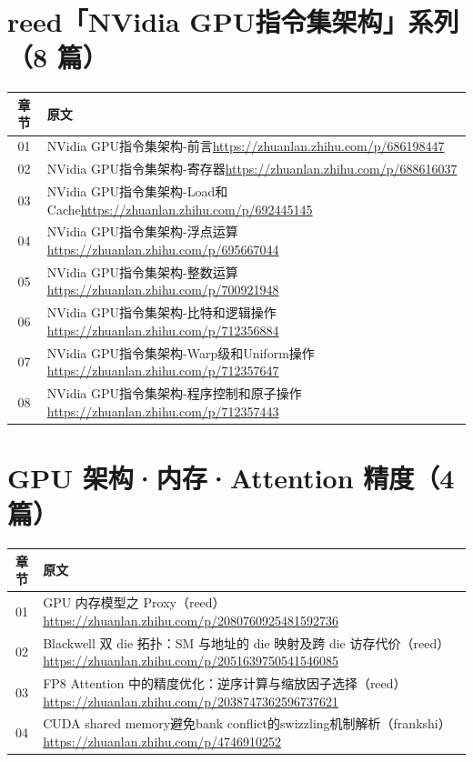 \documentclass[9pt,openany]{ctexbook}
\begin{document}
\section*{reed「NVidia GPU指令集架构」系列（8 篇）}
\begingroup\small
\begin{tabular}{@{}c>{\raggedright\arraybackslash}p{}@{}}
  \toprule
  章节 & 原文 \\
  \midrule
  01 & NVidia GPU指令集架构-前言\newline\url{https://zhuanlan.zhihu.com/p/686198447} \\
  02 & NVidia GPU指令集架构-寄存器\newline\url{https://zhuanlan.zhihu.com/p/688616037} \\
  03 & NVidia GPU指令集架构-Load和Cache\newline\url{https://zhuanlan.zhihu.com/p/692445145} \\
  04 & NVidia GPU指令集架构-浮点运算\newline\url{https://zhuanlan.zhihu.com/p/695667044} \\
  05 & NVidia GPU指令集架构-整数运算\newline\url{https://zhuanlan.zhihu.com/p/700921948} \\
  06 & NVidia GPU指令集架构-比特和逻辑操作\newline\url{https://zhuanlan.zhihu.com/p/712356884} \\
  07 & NVidia GPU指令集架构-Warp级和Uniform操作\newline\url{https://zhuanlan.zhihu.com/p/712357647} \\
  08 & NVidia GPU指令集架构-程序控制和原子操作\newline\url{https://zhuanlan.zhihu.com/p/712357443} \\
  \bottomrule
\end{tabular}
\endgroup

\section*{GPU 架构·内存·Attention 精度（4 篇）}
\begingroup\small
\begin{tabular}{@{}c>{\raggedright\arraybackslash}p{}@{}}
  \toprule
  章节 & 原文 \\
  \midrule
  01 & GPU 内存模型之 Proxy（reed）\newline\url{https://zhuanlan.zhihu.com/p/2080760925481592736} \\
  02 & Blackwell 双 die 拓扑：SM 与地址的 die 映射及跨 die 访存代价（reed）\newline\url{https://zhuanlan.zhihu.com/p/2051639750541546085} \\
  03 & FP8 Attention 中的精度优化：逆序计算与缩放因子选择（reed）\newline\url{https://zhuanlan.zhihu.com/p/2038747362596737621} \\
  04 & CUDA shared memory避免bank conflict的swizzling机制解析（frankshi）\newline\url{https://zhuanlan.zhihu.com/p/4746910252} \\
  \bottomrule
\end{tabular}
\endgroup
\end{document}
